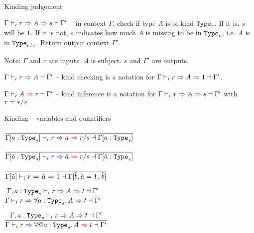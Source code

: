 \documentclass{beamer}
\begin{document}
\begin{frame}{Kinding judgement}

$\newkinding{\Gamma}{r}{A}{s}{\Gamma'}$ -- in context $\Gamma$, check if type $A$ is of kind $\Type[r]$. If it is, $s$ will be $1$. If it is not, $s$ indicates how much $A$ is missing to be in $\Type[r]$, i.e. $A$ is in $\Type[\divqty{r}{s}]$. Return output context $\Gamma'$.

\vspace{2em}

Note: $\Gamma$ and $r$ are inputs. $A$ is subject. $s$ and $\Gamma'$ are outputs.

\vspace{2em}

$\newcheckkind{\Gamma}{r}{A}{\Gamma'}$ -- kind checking is a notation for $\newkinding{\Gamma}{r}{A}{\One}{\Gamma'}$.

\vspace{1em}

$\newinferkind{\Gamma}{A}{r}{\Gamma'}$ -- kind inference is a notation for $\newkinding{\Gamma}{\Any}{A}{s}{\Gamma'}$ with $r = * / s$

\end{frame}

\begin{frame}{Kinding -- variables and quantifiers}

\begin{center}
  $\infrule{}{\newkinding{\holectx{\Gamma}{\tvar{a}[s]}}{r}{a}{\divqty{r}{s}}{\holectx{\Gamma}{\tvar{a}[s]}}}$

  \vspace{2em}

  $\infrule{}{\newkinding{\holectx{\Gamma}{\stvar{a}[s]}}{r}{\stvar{a}}{\divqty{r}{s}}{\holectx{\Gamma}{\stvar{a}[s]}}}$

  \vspace{2em}

  $\infrule{}{\newkinding{\holectx{\Gamma}{\evar{a}}}{r}{\evar{a}}{\One}{\holectx{\Gamma}{\evar{b}, \evar{a}[\Box[r]{\evar{b}}]}}}$

  \vspace{2em}

  $\infrule{\newkinding{\Gamma, \tvar{a}[s]}{r}{A}{t}{\Gamma'}}{\newkinding{\Gamma}{r}{\ForallI{a}[s]{A}}{t}{\Gamma'}}$

  \vspace{2em}

  $\infrule{\newkinding{\Gamma, \tvar{a}[s]}{r}{A}{t}{\Gamma'}}{\newkinding{\Gamma}{r}{\ForallE{a}[s]{A}}{t}{\Gamma'}}$
\end{center}

\end{frame}
\end{document}
